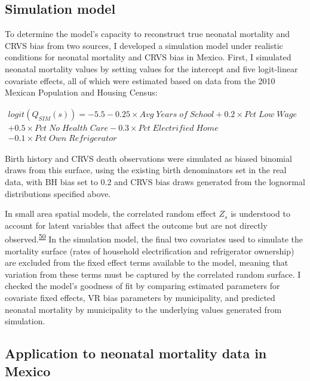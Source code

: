 \documentclass[
]{article}
\begin{document}
\hypertarget{simulation-model}{%
\subsection{Simulation model}\label{simulation-model}}

To determine the model's capacity to reconstruct true neonatal mortality and CRVS bias from two sources, I developed a simulation model under realistic conditions for neonatal mortality and CRVS bias in Mexico. First, I simulated neonatal mortality values by setting values for the intercept and five logit-linear covariate effects, all of which were estimated based on data from the 2010 Mexican Population and Housing Census:

\begin{math}\begin{aligned}
logit(Q_{SIM}(s)) = -5.5 -0.25 \times Avg\;Years\;of\;School + 0.2 \times Pct\;Low\;Wage\\
+ 0.5 \times Pct\;No\;Health\;Care-0.3 \times Pct\;Electrified\;Home
\\- 0.1 \times Pct\;Own\;Refrigerator\;\;\;\;\;\;\;\;\;\;\;\;\;\;\;\;\;\;\;\;\;\;\;\;\;\;\;\;\;\;\;\;\;\;\;\;\;\;\;\;\;\;\;\;\;\;
\end{aligned}\end{math}

Birth history and CRVS death observations were simulated as biased binomial draws from this surface, using the existing birth denominators set in the real data, with BH bias set to 0.2 and CRVS bias draws generated from the lognormal distributions specified above.

In small area spatial models, the correlated random effect \(Z_s\) is understood to account for latent variables that affect the outcome but are not directly observed.\textsuperscript{\protect\hyperlink{ref-Divino2009}{50}} In the simulation model, the final two covariates used to simulate the mortality surface (rates of household electrification and refrigerator ownership) are excluded from the fixed effect terms available to the model, meaning that variation from these terms must be captured by the correlated random surface. I checked the model's goodness of fit by comparing estimated parameters for covariate fixed effects, VR bias parameters by municipality, and predicted neonatal mortality by municipality to the underlying values generated from simulation.

\hypertarget{application-to-neonatal-mortality-data-in-mexico}{%
\subsection{Application to neonatal mortality data in Mexico}\label{application-to-neonatal-mortality-data-in-mexico}}
\end{document}
